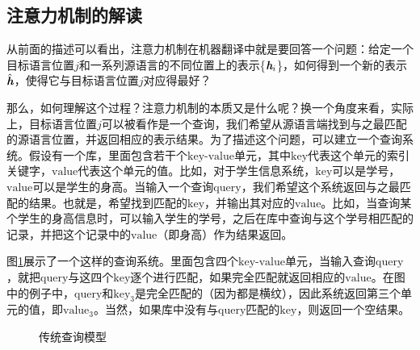 \subsection{注意力机制的解读}
\label{sec:10.1.4}

\vspace{0.5em}
\parinterval 从前面的描述可以看出，注意力机制在机器翻译中就是要回答一个问题：给定一个目标语言位置$j$和一系列源语言的不同位置上的表示\{${\textbf{\em h}_i}$\}，如何得到一个新的表示$\hat{\textbf{\em h}}$，使得它与目标语言位置$j$对应得最好？

\parinterval 那么，如何理解这个过程？注意力机制的本质又是什么呢？换一个角度来看，实际上，目标语言位置$j$可以被看作是一个查询，我们希望从源语言端找到与之最匹配的源语言位置，并返回相应的表示结果。为了描述这个问题，可以建立一个查询系统。假设有一个库，里面包含若干个$\mathrm{key}$-$\mathrm{value}$单元，其中$\mathrm{key}$代表这个单元的索引关键字，$\mathrm{value}$代表这个单元的值。比如，对于学生信息系统，$\mathrm{key}$可以是学号，$\mathrm{value}$可以是学生的身高。当输入一个查询$\mathrm{query}$，我们希望这个系统返回与之最匹配的结果。也就是，希望找到匹配的$\mathrm{key}$，并输出其对应的$\mathrm{value}$。比如，当查询某个学生的身高信息时，可以输入学生的学号，之后在库中查询与这个学号相匹配的记录，并把这个记录中的$\mathrm{value}$（即身高）作为结果返回。

\parinterval 图\ref{fig:10-22}展示了一个这样的查询系统。里面包含四个$\mathrm{key}$-$\mathrm{value}$单元，当输入查询$\mathrm{query}$，就把$\mathrm{query}$与这四个$\mathrm{key}$逐个进行匹配，如果完全匹配就返回相应的$\mathrm{value}$。在图中的例子中，$\mathrm{query}$和$\mathrm{key}_3$是完全匹配的（因为都是横纹），因此系统返回第三个单元的值，即$\mathrm{value}_3$。当然，如果库中没有与$\mathrm{query}$匹配的$\mathrm{key}$，则返回一个空结果。

\begin{figure}[htp]
\centering

\caption{传统查询模型}
\label{fig:10-22}
\end{figure}

